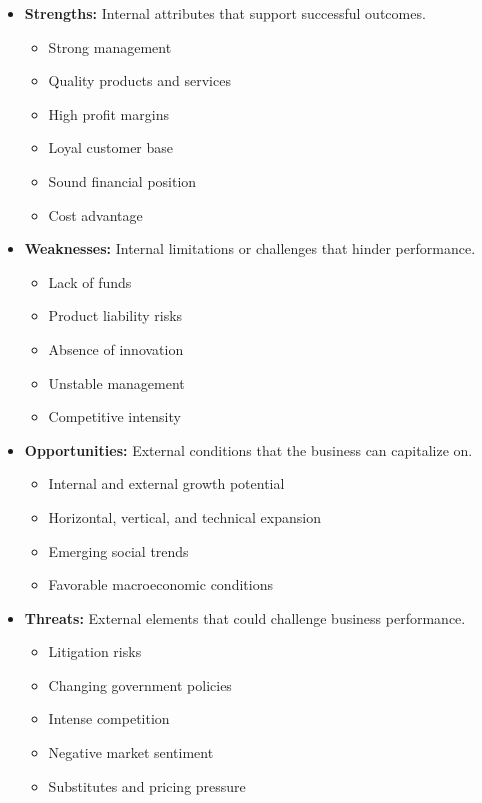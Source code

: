 \documentclass[12pt]{article}
\begin{document}
\begin{itemize}
  \item \textbf{Strengths:} Internal attributes that support successful outcomes.
    \begin{itemize}
        \item Strong management
        \item Quality products and services
        \item High profit margins
        \item Loyal customer base
        \item Sound financial position
        \item Cost advantage
    \end{itemize}

  \item \textbf{Weaknesses:} Internal limitations or challenges that hinder performance.
    \begin{itemize}
        \item Lack of funds
        \item Product liability risks
        \item Absence of innovation
        \item Unstable management
        \item Competitive intensity
    \end{itemize}

  \item \textbf{Opportunities:} External conditions that the business can capitalize on.
    \begin{itemize}
        \item Internal and external growth potential
        \item Horizontal, vertical, and technical expansion
        \item Emerging social trends
        \item Favorable macroeconomic conditions
    \end{itemize}

  \item \textbf{Threats:} External elements that could challenge business performance.
    \begin{itemize}
        \item Litigation risks
        \item Changing government policies
        \item Intense competition
        \item Negative market sentiment
        \item Substitutes and pricing pressure
    \end{itemize}
\end{itemize}
\end{document}
